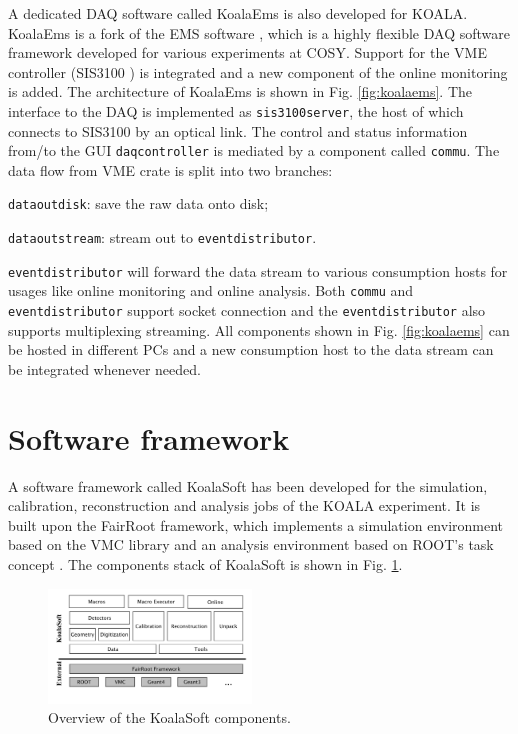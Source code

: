 \documentclass[number,5p]{elsarticle}
\begin{document}
A dedicated DAQ software called KoalaEms is also developed for KOALA.
KoalaEms is a fork of the EMS software \cite{ems}, which is a highly flexible DAQ software framework developed for various experiments at COSY.
Support for the VME controller (SIS3100 \cite{sis}) is integrated and a new
component of the online monitoring is added.
The architecture of KoalaEms is shown in Fig. \ref{fig:koalaems}.
The interface to the DAQ is implemented as \texttt{sis3100\textunderscore server}, the host of which
connects to SIS3100 by an optical link.
The control and status information from/to the GUI \texttt{daq\textunderscore controller} is mediated by a component called \texttt{commu}.
The data flow from VME crate is split into two branches:
\begin{enumerate*}[label=(\roman*)]
\item \texttt{data\textunderscore out\textunderscore di\allowbreak sk}: save the raw data onto disk;
\item \texttt{data\textunderscore out\textunderscore stream}: stream out to \texttt{event\textunderscore distributor}.
\end{enumerate*}
\texttt{event\textunderscore distributor} will forward the data stream to various consumption hosts for usages like online monitoring and online analysis.
Both \texttt{commu} and \texttt{event\textunderscore distributor} support socket connection and the \texttt{event\textunderscore distributor} also supports multiplexing streaming.
All components shown in Fig. \ref{fig:koalaems} can be hosted in different PCs
and a new consumption host to the data stream can be integrated whenever needed.

\section{Software framework}
\label{sec:software}

A software framework called KoalaSoft has been developed for the simulation, calibration, reconstruction and analysis jobs of the KOALA experiment.
It is built upon the FairRoot \cite{fairroot} framework, which implements a
simulation environment based on the VMC \cite{vmc} library and an analysis
environment based on ROOT's task concept \cite{root}.
The components stack of KoalaSoft is shown in Fig. \ref{fig:koalasoft}.

\begin{figure}[htbp]
  \centering
  \includegraphics[width=0.48\textwidth]{./koalasoft_components.png}
  \caption{Overview of the KoalaSoft components.}
  \label{fig:koalasoft}
\end{figure}
\end{document}
